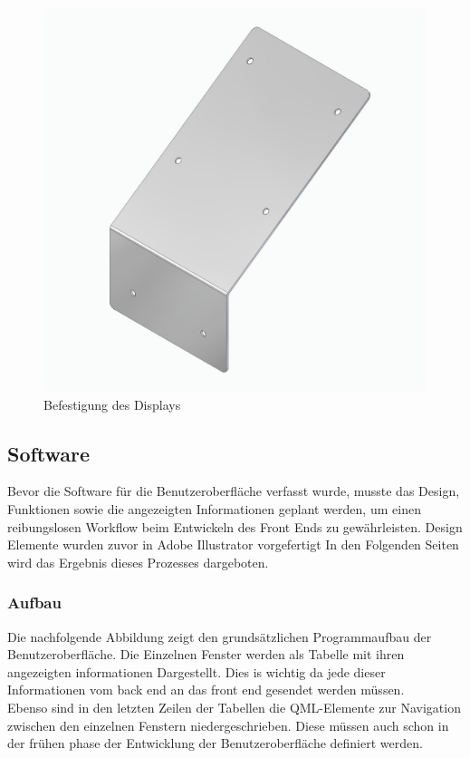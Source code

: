 \begin{figure}[H]
	\begin{center}
		\includegraphics[scale=0.2]{figures/hcis/befestigung_display.jpg}
		\caption{Befestigung des Displays}
		\label{fig:befestigung}
	\end{center}
\end{figure}

\subsection{Software}
Bevor die Software für die Benutzeroberfläche verfasst wurde, musste das Design, Funktionen sowie die angezeigten Informationen geplant werden, um einen reibungslosen Workflow beim Entwickeln des Front Ends zu gewährleisten. Design Elemente wurden zuvor in Adobe Illustrator vorgefertigt In den Folgenden Seiten wird das Ergebnis dieses Prozesses dargeboten.
\subsubsection{Aufbau}
Die nachfolgende Abbildung zeigt den grundsätzlichen Programmaufbau der Benutzeroberfläche. Die Einzelnen Fenster werden als Tabelle mit ihren angezeigten informationen Dargestellt. Dies is wichtig da jede dieser Informationen vom back end an das front end gesendet werden müssen.\\
Ebenso sind in den letzten Zeilen der Tabellen die QML-Elemente zur Navigation zwischen den einzelnen Fenstern niedergeschrieben. Diese müssen auch schon in der frühen phase der Entwicklung der Benutzeroberfläche definiert werden.

